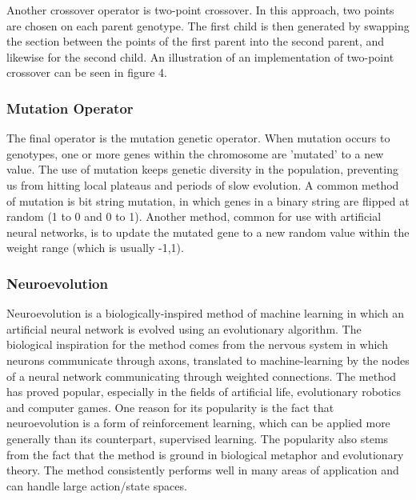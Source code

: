 \documentclass[12pt,a4paper]{article}
\begin{document}
Another crossover operator is two-point crossover. In this approach, two points are chosen on each parent genotype. The first child is then generated by swapping the section between the points of the first parent into the second parent, and likewise for the second child. An illustration of an implementation of two-point crossover can be seen in figure 4.\\

\begin{figure}[h]
\end{figure}
\subsubsection*{Mutation Operator}
The final operator is the mutation genetic operator. When mutation occurs to genotypes, one or more genes within the chromosome are 'mutated' to a new value. The use of mutation keeps genetic diversity in the population, preventing us from hitting local plateaus and periods of slow evolution. A common method of mutation is bit string mutation, in which genes in a binary string are flipped at random (1 to 0 and 0 to 1). Another method, common for use with artificial neural networks, is to update the mutated gene to a new random value within the weight range (which is usually -1,1).
\newpage
\subsubsection{Neuroevolution}
Neuroevolution is a biologically-inspired method of machine learning in which an artificial neural network is evolved using an evolutionary algorithm. The biological inspiration for the method comes from the nervous system in which neurons communicate through axons, translated to machine-learning by the nodes of a neural network communicating through weighted connections. The method has proved popular, especially in the fields of artificial life, evolutionary robotics and computer games. One reason for its popularity is the fact that neuroevolution is a form of reinforcement learning, which can be applied more generally than its counterpart, supervised learning. The popularity also stems from the fact that the method is ground in biological metaphor and evolutionary theory. The method consistently performs well in many areas of application and can handle large action/state spaces. \cite{risi}\\
\end{document}
